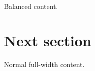 \documentclass{article}
\begin{document}
\begin{minipage}{0.8\linewidth}
Balanced content.
\end{minipage}
\clearpage
\section{Next section}
Normal full-width content.
\end{document}
